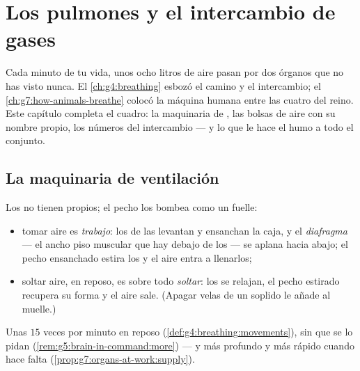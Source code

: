 \chapter{Los pulmones y el intercambio de gases}\label{ch:g7:lungs-and-gas-exchange}

Cada minuto de tu vida, unos ocho litros de aire pasan por dos órganos
que no has visto nunca. El \cref{ch:g4:breathing} esbozó el camino y el
intercambio; el \cref{ch:g7:how-animals-breathe} colocó la máquina
humana entre las cuatro del reino. Este capítulo completa el cuadro: la
maquinaria de , las bolsas de aire con su nombre propio, los
números del intercambio --- y lo que le hace el humo a todo el conjunto.

\section{La maquinaria de ventilación}

\begin{proposition}\label{prop:g7:lungs-and-gas-exchange:ventilation}
Los  no tienen  propios; el pecho los bombea como un
fuelle:
\begin{itemize}
  \item tomar aire es \emph{trabajo}: los  de las 
        levantan y ensanchan la caja, y el
        \emph{diafragma} --- el ancho piso muscular
        que hay debajo de los  --- se aplana hacia abajo; el
        pecho ensanchado estira los  y el aire entra a
        llenarlos;
  \item soltar aire, en reposo, es sobre todo \emph{soltar}: los
         se relajan, el pecho estirado recupera su forma y el
        aire sale. (Apagar velas de un soplido le añade  al
        muelle.)
\end{itemize}
Unas $15$ veces por minuto en reposo
(\cref{def:g4:breathing:movements}), sin que se lo pidan
(\cref{rem:g5:brain-in-command:more}) --- y más profundo y más rápido
cuando hace falta (\cref{prop:g7:organs-at-work:supply}).
\end{proposition}
\admitted

